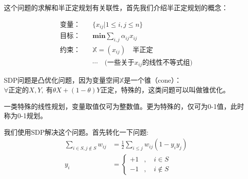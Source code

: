 \documentclass[lang=cn,newtx,10pt,scheme=chinese,chinesefont=nofont,citestyle=gb7714-2015, bibstyle=gb7714-2015]{elegantbook}
\begin{document}
\begin{refsection}
\begin{tikzpicture}[
    vertex/.style={circle, draw, minimum size=8mm, thick, fill=white},
    edge/.style={thick},
    cut edge/.style={thick, red, dashed},
    normal edge/.style={thick, blue}
]
\end{tikzpicture}
{\captionsetup{hypcap=false}}
这个问题的求解和半正定规划有关联性，首先我们介绍半正定规划的概念：

\begin{definition}[半正定规划]\label{SDP}
    \begin{align*}
        \text{变量：}\quad &\{x_{ij}|1\leq i,j\leq n\}\\
        \text{目标：}\quad &\textbf{min}\sum_{i,j}\alpha_{ij}x_{ij}\\
        \text{约束：}\quad &\mathbb{X} = (x_{ij}) \quad \text{半正定}\\
        & \cdots\quad\text{(一些关于}x_{ij}\text{的线性不等式组)}
    \end{align*}
\end{definition}

\begin{remark}
    SDP问题是凸优化问题，因为变量空间$\mathbb{X}$是一个锥（cone）：$\forall \text{正定的}X,Y, \ \text{有}\theta X+(1-\theta )Y\text{正定}$，特殊的，这类问题可以叫做锥优化。
\end{remark}

\begin{definition}[整数线性规划]
    一类特殊的线性规划，变量取值仅可为整数值。更为特殊的，仅可为0-1值，此时称为0-1规划。
\end{definition}


我们使用SDP解决这个问题。首先转化一下问题:
\begin{align}
    \sum_{i\in S, j\notin S}w_{ij} &= \frac{1}{2}\sum_{i\le j}w_{ij}(1-y_iy_j)\\
     y_i&=\left\{
\begin{aligned}
+1 & ,\quad   i\in S \\
-1 & ,\quad   i\notin S
\end{aligned}
\right.
\end{align}


\end{refsection}
\end{document}
